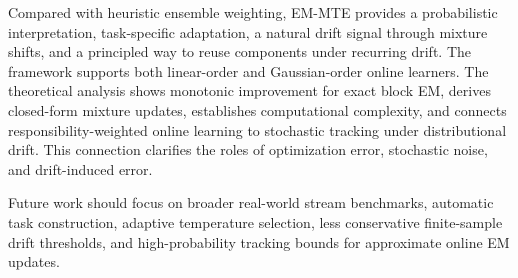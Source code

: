 ﻿\documentclass[12pt,a4paper]{article}
\begin{document}
Compared with heuristic ensemble weighting, EM-MTE provides a probabilistic interpretation, task-specific adaptation, a natural drift signal through mixture shifts, and a principled way to reuse components under recurring drift. The framework supports both linear-order and Gaussian-order online learners. The theoretical analysis shows monotonic improvement for exact block EM, derives closed-form mixture updates, establishes computational complexity, and connects responsibility-weighted online learning to stochastic tracking under distributional drift. This connection clarifies the roles of optimization error, stochastic noise, and drift-induced error.

Future work should focus on broader real-world stream benchmarks, automatic
task construction, adaptive temperature selection, less conservative
finite-sample drift thresholds, and high-probability tracking bounds for
approximate online EM updates.
\end{document}
